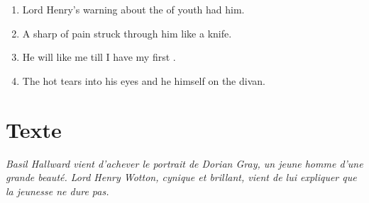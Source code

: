 \documentclass{fiche}
\begin{document}
\begin{anglais}
\begin{enumerate}[label=\arabic*.,itemsep=2mm,leftmargin=*]
  \item Lord Henry's warning about the  of youth had  him.
  \item A sharp  of pain struck through him like a knife.
  \item He will like me till I have my first .
  \item The hot tears  into his eyes and he  himself on the divan.
\end{enumerate}
\end{anglais}

\newpage
\section{Texte}

\noindent\small\textit{Basil Hallward vient d'achever le portrait de Dorian Gray, un jeune
homme d'une grande beauté. Lord Henry Wotton, cynique et brillant, vient de lui expliquer
que la jeunesse ne dure pas.}\normalsize
\end{document}
